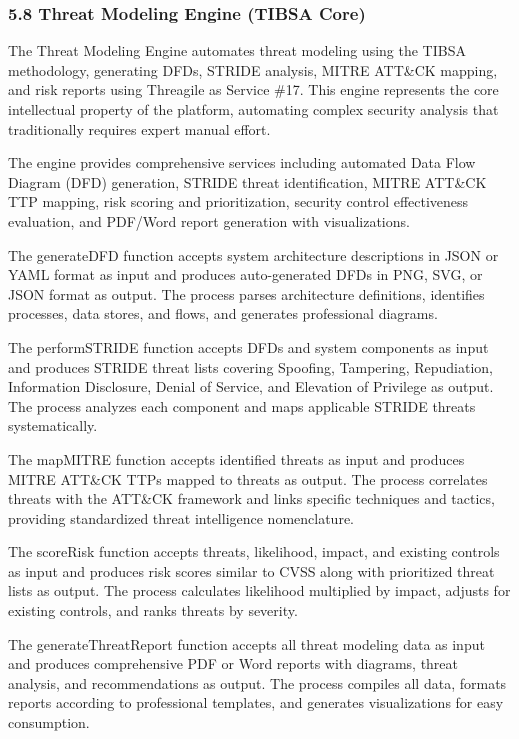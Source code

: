 \documentclass[12pt,a4paper]{report}
\begin{document}
\subsubsection{5.8 Threat Modeling Engine (TIBSA Core)}

The Threat Modeling Engine automates threat modeling using the TIBSA methodology, generating DFDs, STRIDE analysis, MITRE ATT\&CK mapping, and risk reports using Threagile as Service \#17. This engine represents the core intellectual property of the platform, automating complex security analysis that traditionally requires expert manual effort.

The engine provides comprehensive services including automated Data Flow Diagram (DFD) generation, STRIDE threat identification, MITRE ATT\&CK TTP mapping, risk scoring and prioritization, security control effectiveness evaluation, and PDF/Word report generation with visualizations.

The generateDFD function accepts system architecture descriptions in JSON or YAML format as input and produces auto-generated DFDs in PNG, SVG, or JSON format as output. The process parses architecture definitions, identifies processes, data stores, and flows, and generates professional diagrams.

The performSTRIDE function accepts DFDs and system components as input and produces STRIDE threat lists covering Spoofing, Tampering, Repudiation, Information Disclosure, Denial of Service, and Elevation of Privilege as output. The process analyzes each component and maps applicable STRIDE threats systematically.

The mapMITRE function accepts identified threats as input and produces MITRE ATT\&CK TTPs mapped to threats as output. The process correlates threats with the ATT\&CK framework and links specific techniques and tactics, providing standardized threat intelligence nomenclature.

The scoreRisk function accepts threats, likelihood, impact, and existing controls as input and produces risk scores similar to CVSS along with prioritized threat lists as output. The process calculates likelihood multiplied by impact, adjusts for existing controls, and ranks threats by severity.

The generateThreatReport function accepts all threat modeling data as input and produces comprehensive PDF or Word reports with diagrams, threat analysis, and recommendations as output. The process compiles all data, formats reports according to professional templates, and generates visualizations for easy consumption.
\end{document}
